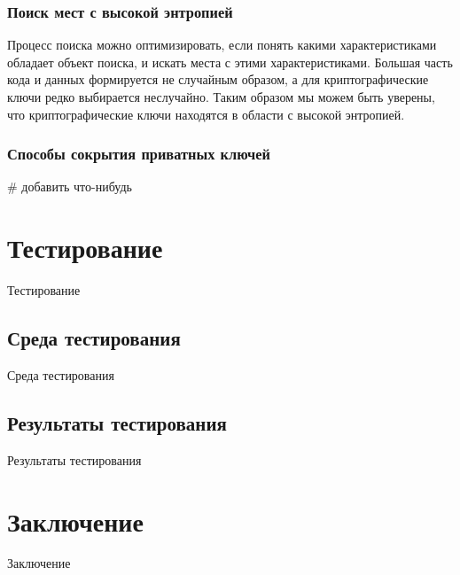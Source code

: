 \documentclass[20pt]{article}
\begin{document}
\subsubsection{Поиск мест с высокой энтропией}

Процесс поиска можно оптимизировать, если понять какими характеристиками обладает объект поиска, и искать места с этими характеристиками. Большая часть кода и данных формируется не случайным образом, а для криптографические ключи редко выбирается неслучайно. Таким образом мы можем быть уверены, что криптографические ключи находятся в области с высокой энтропией.

\subsubsection{Способы сокрытия приватных ключей}
\# добавить что-нибудь

\newpage

\section{Тестирование}
Тестирование

\subsection{Среда тестирования}
Среда тестирования

\subsection{Результаты тестирования}
Результаты тестирования

\newpage

\section{Заключение}
Заключение



\end{document}
